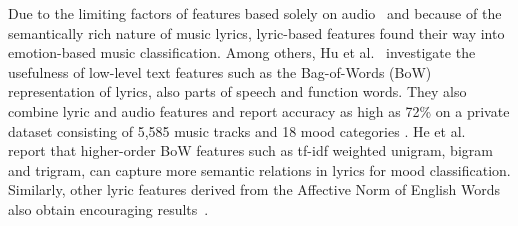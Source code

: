 \documentclass{llncs}
\begin{document}

Due to the limiting factors of features based solely on audio~\cite{DBLP:journals/taslp/LuLZ06} and because of the semantically rich nature of music lyrics, lyric-based features found their way into emotion-based music classification. Among others, Hu et al.~\cite{DBLP:conf/ismir/HuDE09} investigate the usefulness of low-level text features such as the Bag-of-Words (BoW) representation of lyrics, also parts of speech and function words. They also combine lyric and audio features and report accuracy as high as 72\% on a private dataset consisting of 5,585 music tracks and 18 mood categories \cite{DBLP:conf/ismir/HuDLBE08}. He et al.~\cite{DBLP:conf/isica/HeJXCSZ08} report that higher-order BoW features such as tf-idf weighted unigram, bigram and trigram, can capture more semantic relations in lyrics for mood classification. Similarly, other lyric features derived from the Affective Norm of English Words also obtain encouraging results~\cite{DBLP:conf/ismir/HuCY09}. 


\end{document}
